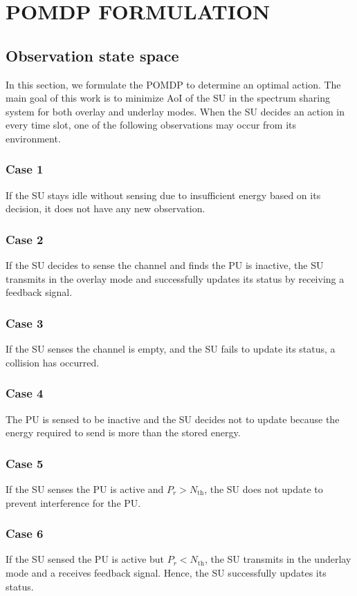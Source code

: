 \documentclass[journal]{IEEEtran}
\begin{document}
	\section{POMDP FORMULATION}
		\subsection{Observation state space}
			In this section, we formulate the POMDP to determine an optimal action. The main goal of this work is to minimize AoI of the SU in the spectrum sharing system for both overlay and underlay modes. When the SU decides an action in every time slot, one of the following observations may occur from its environment.
		\subsubsection{Case 1}
			If the SU stays idle without sensing due to insufficient energy based on its decision, it does not have any new observation.
		\subsubsection{Case 2}
			If the SU decides to sense the channel and finds the PU is inactive, the SU transmits in the overlay mode and successfully updates its status by receiving a feedback signal.
		\subsubsection{Case 3}
			If the SU senses the channel is empty, and the SU fails to update its status, a collision has occurred.
		\subsubsection{Case 4}
			The PU is sensed to be inactive and the SU decides not to update because the energy required to send is more than the stored energy.
		\subsubsection{Case 5}
			If the SU senses the PU is active and $P_r > N_{\text{th}}$, the SU does not update to prevent interference for the PU.
		\subsubsection{Case 6}
			If the SU sensed the PU is active but $P_r < N_{\text{th}}$, the SU transmits in the underlay mode and a receives feedback signal. Hence, the SU successfully updates its status.
\end{document}
